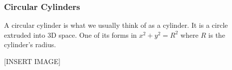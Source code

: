 \subsubsection{Circular Cylinders}
\noindent
A circular cylinder is what we usually think of as a cylinder. It is a circle extruded into 3D space. One of its forms in $x^2+y^2=R^2$ where $R$ is the cylinder's radius.

[INSERT IMAGE]